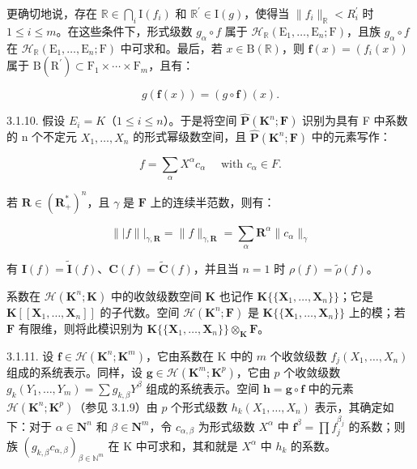 更确切地说，存在 \(\mathbb{R}\in\bigcap_{i}\mathrm{I}(f_{i})\) 和 \(\mathbb{R}^{\prime}\in\mathrm{I}(g)\)，使得当 \(\|f_{i}\|_{\mathbb{R}}<R_{i}^{\prime}\) 时 \(1\leqslant i\leqslant m\)。在这些条件下，形式级数 \(g_{\alpha}\circ f\) 属于 \(\mathcal{H}_{\mathbb{R}}(\mathrm{E}_{1},\ldots,\mathrm{E}_{n};\mathrm{F})\)，且族 \(g_{\alpha}\circ f\) 在 \(\mathcal{H}_{\mathbb{R}}(\mathrm{E}_{1},\ldots,\mathrm{E}_{n};\mathrm{F})\) 中可求和。最后，若 \(x\in\mathrm{B}(\mathbb{R})\)，则 \(\mathbf{f}(x)=(f_{i}(x))\) 属于 \(\mathrm{B}(\mathrm{R}^{\prime})\subset\mathrm{F}_{1}\times\cdots\times\mathrm{F}_{m}\)，且有：

\[
g (\mathbf {f} (x)) = (g \circ \mathbf {f}) (x).
\]

3.1.10. 假设 \(E_{i} = K\)（\(1 \leqslant i \leqslant n\)）。于是将空间 \(\hat{\mathbf{P}}(\mathbf{K}^{n}; \mathbf{F})\) 识别为具有 F 中系数的 n 个不定元 \(X_{1}, \ldots, X_{n}\) 的形式幂级数空间，且 \(\hat{\mathbf{P}}(\mathbf{K}^{n};\mathbf{F})\) 中的元素写作：

\[
f = \sum_ {\alpha} X ^ {\alpha} c _ {\alpha} \quad \text {   with   } c _ {\alpha} \in F.
\]

若 \(\mathbf{R} \in (\mathbf{R}_{+}^{*})^{n}\)，且 \(\gamma\) 是 \(\mathbf{F}\) 上的连续半范数，则有：

\[
\| | f \| | _ {\gamma , \mathbf {R}} = \| f \| _ {\gamma , \mathbf {R}} = \sum_ {\alpha} \mathbf {R} ^ {\alpha} \| c _ {\alpha} \| _ {\gamma}
\]

有 \(\mathbf{I}(f) = \tilde{\mathbf{I}}(f)\)、\(\mathbf{C}(f) = \tilde{\mathbf{C}}(f)\)，并且当 \(n = 1\) 时 \(\rho(f) = \tilde{\rho}(f)\)。

系数在 \(\mathcal{H}(\mathbf{K}^{n};\mathbf{K})\) 中的收敛级数空间 \(\mathbf{K}\) 也记作 \(\mathbf{K}\{\{\mathbf{X}_{1},\ldots ,\mathbf{X}_{n}\}\}\)；它是 \(\mathbf{K}[[\mathbf{X}_1,\dots ,\mathbf{X}_n]]\) 的子代数。空间 \(\mathcal{H}(\mathbf{K}^n;\mathbf{F})\) 是 \(\mathbf{K}\{\{\mathbf{X}_1,\ldots ,\mathbf{X}_n\}\}\) 上的模；若 \(\mathbf{F}\) 有限维，则将此模识别为 \(\mathbf{K}\{\{\mathbf{X}_1,\ldots ,\mathbf{X}_n\}\} \otimes_{\mathbf{K}}\mathbf{F}\)。

3.1.11. 设 \(\mathbf{f} \in \mathcal{H}(\mathbf{K}^n; \mathbf{K}^m)\)，它由系数在 K 中的 \(m\) 个收敛级数 \(f_j(X_1, \ldots, X_n)\) 组成的系统表示。同样，设 \(\mathbf{g} \in \mathcal{H}(\mathbf{K}^m; \mathbf{K}^p)\)，它由 \(p\) 个收敛级数 \(g_k(Y_1, \ldots, Y_m) = \sum g_{k,\beta} Y^\beta\) 组成的系统表示。空间 \(\mathbf{h} = \mathbf{g} \circ \mathbf{f}\) 中的元素 \(\mathcal{H}(\mathbf{K}^n; \mathbf{K}^p)\)（参见 3.1.9）由 \(p\) 个形式级数 \(h_k(X_1, \ldots, X_n)\) 表示，其确定如下：对于 \(\alpha \in \mathbf{N}^n\) 和 \(\beta \in \mathbf{N}^m\)，令 \(c_{\alpha,\beta}\) 为形式级数 \(X^\alpha\) 中 \(\mathbf{f}^\beta = \prod f_j^{\beta_j}\) 的系数；则族 \((g_{k,\beta} c_{\alpha,\beta})_{\beta \in \mathbb{N}^m}\) 在 K 中可求和，其和就是 \(X^\alpha\) 中 \(h_k\) 的系数。

